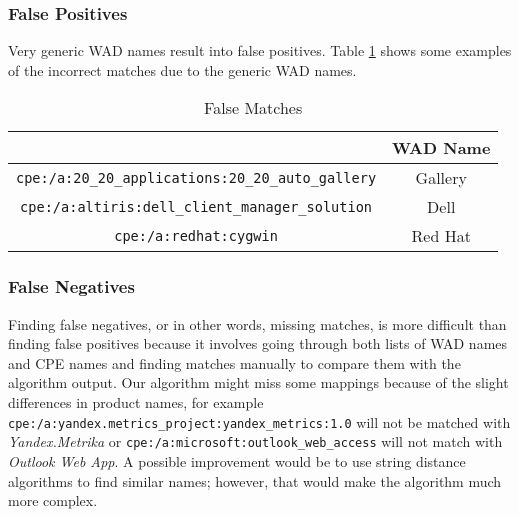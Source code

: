 \subsubsection{False Positives}
Very generic WAD names result into false positives. Table \ref{table:false_positives} shows some examples of the incorrect matches due to the generic WAD names. 
\begin{table}
\begin{center}
    \begin{tabular}{ | c | c | }
    
    \hline
	  \hhline{|*2-}
    \multicolumn{1}{|c|}{\cellcolor{LightBlue}\textbf{CPE}} & \multicolumn{1}{|c|}{\cellcolor{LightBlue}\textbf{WAD Name}}  
    \\ \hline
    \texttt{cpe:/a:20\_20\_applications:20\_20\_auto\_gallery} & Gallery
        \\ \hline
    \texttt{cpe:/a:altiris:dell\_client\_manager\_solution} & Dell
        \\ \hline
    \texttt{cpe:/a:redhat:cygwin} & Red Hat
        \\ \hline
    \end{tabular}
    \caption{False Matches}
    \label{table:false_positives}
   \end{center}
\end{table}

\subsubsection{False Negatives}
Finding false negatives, or in other words, missing matches, is more difficult than finding false positives because it involves going through both lists of WAD names and CPE names and finding matches manually to compare them with the algorithm output. Our algorithm might miss some mappings because of the  slight differences in product names, for example  \texttt{cpe:/a:yandex.metrics\_project:yandex\_metrics:1.0} will not be matched with \textit{Yandex.Metrika} or \texttt{cpe:/a:microsoft:outlook\_web\_access} will not match with \textit{Outlook Web App}. A possible improvement would be to use string distance algorithms to find similar names; however, that would make the algorithm much more complex.
